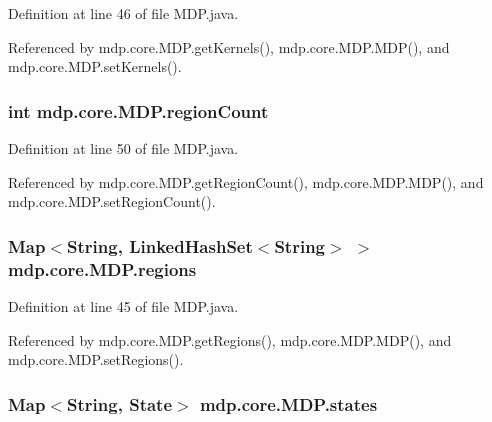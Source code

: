 Definition at line 46 of file M\+D\+P.\+java.



Referenced by mdp.\+core.\+M\+D\+P.\+get\+Kernels(), mdp.\+core.\+M\+D\+P.\+M\+D\+P(), and mdp.\+core.\+M\+D\+P.\+set\+Kernels().

\hypertarget{classmdp_1_1core_1_1_m_d_p_ae2644b9387e09a5c2ab096c0bb519f8d}{}
\subsubsection[{region\+Count}]{\setlength{\rightskip}{0pt plus 5cm}int mdp.\+core.\+M\+D\+P.\+region\+Count\hspace{0.3cm}{\ttfamily [private]}}\label{classmdp_1_1core_1_1_m_d_p_ae2644b9387e09a5c2ab096c0bb519f8d}


Definition at line 50 of file M\+D\+P.\+java.



Referenced by mdp.\+core.\+M\+D\+P.\+get\+Region\+Count(), mdp.\+core.\+M\+D\+P.\+M\+D\+P(), and mdp.\+core.\+M\+D\+P.\+set\+Region\+Count().

\hypertarget{classmdp_1_1core_1_1_m_d_p_a79761e7b3bb0d7a083bee7183c992893}{}
\subsubsection[{regions}]{\setlength{\rightskip}{0pt plus 5cm}Map$<$String, Linked\+Hash\+Set$<$String$>$ $>$ mdp.\+core.\+M\+D\+P.\+regions\hspace{0.3cm}{\ttfamily [private]}}\label{classmdp_1_1core_1_1_m_d_p_a79761e7b3bb0d7a083bee7183c992893}


Definition at line 45 of file M\+D\+P.\+java.



Referenced by mdp.\+core.\+M\+D\+P.\+get\+Regions(), mdp.\+core.\+M\+D\+P.\+M\+D\+P(), and mdp.\+core.\+M\+D\+P.\+set\+Regions().

\hypertarget{classmdp_1_1core_1_1_m_d_p_a62bf7674d88162db7d00cfd82603b24f}{}
\subsubsection[{states}]{\setlength{\rightskip}{0pt plus 5cm}Map$<$String, {\bf State}$>$ mdp.\+core.\+M\+D\+P.\+states\hspace{0.3cm}{\ttfamily [private]}}\label{classmdp_1_1core_1_1_m_d_p_a62bf7674d88162db7d00cfd82603b24f}


